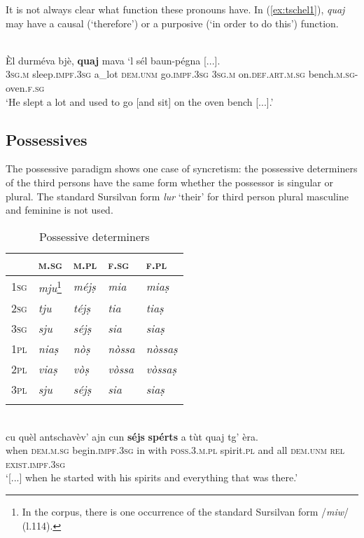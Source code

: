 It is not always clear what function these pronouns have. In (\ref{ex:tschel1}), \textit{quaj} may have a causal (`therefore') or a purposive (`in order to do this') function.

\ea
\label{ex:tschel1}
\\
\gll  Èl durméva bjè, \textbf{quaj} mava `l sél baun-pégna [...].\\
\textsc{3sg.m} sleep.\textsc{impf.3sg} a\_lot \textsc{dem.unm} go.\textsc{impf.3sg} \textsc{3sg.m} on.\textsc{def.art.m.sg} bench.\textsc{m.sg}-oven.\textsc{f.sg}\\
\glt `He slept a lot and used to go [and sit] on the oven bench [...].'
\z

\subsection{Possessives}
The possessive paradigm shows one case of syncretism: the possessive determiners of the third persons have the same form whether the possessor is singular or plural. The standard Sursilvan form \textit{lur} `their' for third person plural masculine and feminine is not used.

\begin{table}
	\caption{Possessive determiners}
	\label{possdet}
	\begin{tabular}{lllll}
		\lsptoprule
		& \textsc{m.sg} & \textsc{m.pl}  & \textsc{f.sg}  & \textsc{f.pl}\\
		\midrule
		\textsc{1sg}  & \textit{mju}\footnote{In the corpus, there is one occurrence of the standard Sursilvan form /\textit{miw}/ (l.114).}  & \textit{méjṣ} &  \textit{mia} & \textit{miaṣ}\\
		\textsc{2sg} & \textit{tju} & \textit{téjṣ} & \textit{tia} & \textit{tiaṣ}\\
		\textsc{3sg} & \textit{sju} & \textit{séjṣ} & \textit{sia} & \textit{siaṣ}\\
		\textsc{1pl} & \textit{niaṣ} & \textit{nòṣ} & \textit{nòssa} & \textit{nòssaṣ}\\
		\textsc{2pl} & \textit{viaṣ}  & \textit{vòṣ} & \textit{vòssa} & \textit{vòssaṣ}\\
		\textsc{3pl}	& \textit{sju} & \textit{séjṣ}  & \textit{sia} & \textit{siaṣ}\\
		\lspbottomrule
	\end{tabular}
\end{table}

\ea
\label{}
\\
\gll [...] cu quèl antschavèv’ ajn cun \textbf{séjs} \textbf{spérts} a tùt quaj tg’ èra.\\
{} when \textsc{dem.m.sg} begin.\textsc{impf.3sg} in with \textsc{poss.3.m.pl} spirit.\textsc{pl}  and all \textsc{dem.unm} \textsc{rel} \textsc{exist.impf.3sg}  \\
\glt `[...] when he started with his spirits and everything that was there.'
\z


